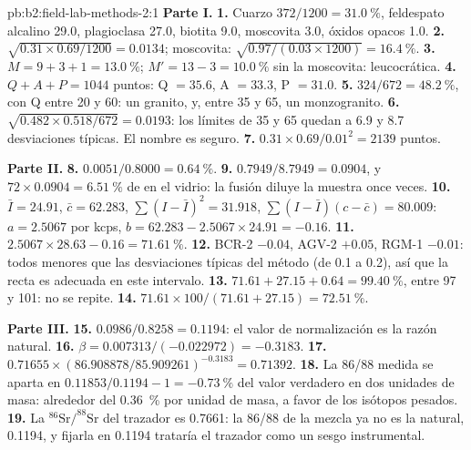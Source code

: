 \begin{solution}{pb:b2:field-lab-methods-2:1}
\noindent\textbf{Parte I.}
\textbf{1.} Cuarzo $372/1200 = \qty{31.0}{\percent}$, feldespato alcalino 29.0, plagioclasa 27.0, biotita
9.0, moscovita 3.0, óxidos opacos 1.0.
\textbf{2.} $\sqrt{0.31 \times 0.69/1200} = 0.0134$; moscovita: $\sqrt{0.97/(0.03 \times 1200)} =
\qty{16.4}{\percent}$.
\textbf{3.} $M = 9 + 3 + 1 = \qty{13.0}{\percent}$; $M' = 13 - 3 = \qty{10.0}{\percent}$ sin la
moscovita: leucocrática.
\textbf{4.} $Q + A + P = 1044$ puntos: Q $= 35.6$, A $= 33.3$, P $= 31.0$.
\textbf{5.} $324/672 = \qty{48.2}{\percent}$, con Q entre 20 y 60: un granito, y, entre 35 y
65, un monzogranito.
\textbf{6.} $\sqrt{0.482 \times 0.518/672} = 0.0193$: los límites de 35 y 65 quedan a 6.9 y 8.7
desviaciones típicas. El nombre es seguro.
\textbf{7.} $0.31 \times 0.69/0.01^2 = 2139$ puntos.

\noindent\textbf{Parte II.}
\textbf{8.} $0.0051/0.8000 = \qty{0.64}{\percent}$.
\textbf{9.} $0.7949/8.7949 = 0.0904$, y $72 \times 0.0904 = \qty{6.51}{\percent}$ de  en el
vidrio: la fusión diluye la muestra once veces.
\textbf{10.} $\bar I = 24.91$, $\bar c = 62.283$, $\sum(I - \bar I)^2 = 31.918$, $\sum(I - \bar I)(c -
\bar c) = 80.009$: $a = 2.5067$ por kcps, $b = 62.283 - 2.5067 \times 24.91 = -0.16$.
\textbf{11.} $2.5067 \times 28.63 - 0.16 = \qty{71.61}{\percent}$.
\textbf{12.} BCR-2 $-0.04$, AGV-2 $+0.05$, RGM-1 $-0.01$: todos menores que las desviaciones típicas
del método (de 0.1 a 0.2), así que la recta es adecuada en este intervalo.
\textbf{13.} $71.61 + 27.15 + 0.64 = \qty{99.40}{\percent}$, entre 97 y 101: no se repite.
\textbf{14.} $71.61 \times 100/(71.61 + 27.15) = \qty{72.51}{\percent}$.

\noindent\textbf{Parte III.}
\textbf{15.} $0.0986/0.8258 = 0.1194$: el valor de normalización es la razón natural.
\textbf{16.} $\beta = 0.007313/(-0.022972) = -0.3183$.
\textbf{17.} $0.71655 \times (86.908878/85.909261)^{-0.3183} = 0.71392$.
\textbf{18.} La 86/88 medida se aparta en $0.11853/0.1194 - 1 = \qty{-0.73}{\percent}$ del valor verdadero
en dos unidades de masa: alrededor del \qty{0.36}{\percent} por unidad de masa, a favor de los isótopos pesados.
\textbf{19.} La $^{86}\mathrm{Sr}/^{88}\mathrm{Sr}$ del trazador es 0.7661: la 86/88 de la mezcla ya no es
la natural, 0.1194, y fijarla en 0.1194 trataría el trazador como un sesgo instrumental.


\end{solution}

